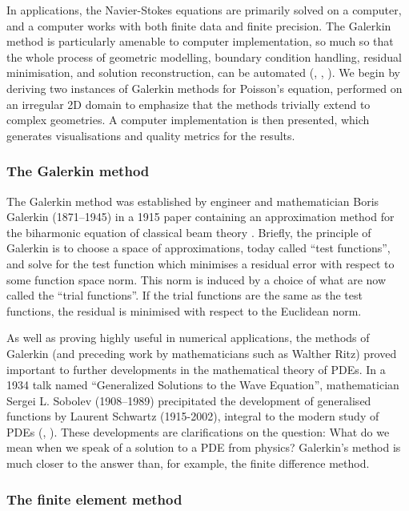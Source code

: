 In applications, the Navier-Stokes equations are primarily
solved on a computer, and a computer works with both finite data and finite precision. The Galerkin method
is particularly amenable to computer implementation, so much so that the whole process of geometric modelling, boundary condition handling,
residual minimisation, and solution reconstruction, can be automated (\cite{firedrake}, \cite{fenics_book}, \cite{DOLFIN}). We begin by
deriving two instances of Galerkin methods for Poisson's equation, performed on an irregular 2D domain to emphasize that the methods trivially extend
to complex geometries. A computer implementation is then presented, which generates visualisations and quality metrics for the results.



\subsubsection{The Galerkin method}
The Galerkin method was established by engineer and mathematician Boris Galerkin (1871--1945) in a 1915 paper containing
an approximation method for the biharmonic equation of classical beam theory \cite{boris_galerkin}. Briefly, the principle of Galerkin is to
choose a space of approximations, today called ``test functions'', and solve for the test function which minimises a residual error with respect
to some function space norm. This norm is induced by a choice of what are now called the ``trial functions''. If the trial functions are the same as the test functions,
the residual is minimised with respect to the Euclidean norm.

As well as proving highly useful
in numerical applications, the methods of Galerkin (and preceding work by mathematicians such as Walther Ritz) proved important to further developments
in the mathematical theory of PDEs. In a 1934 talk named ``Generalized Solutions to the Wave Equation'', mathematician Sergei L. Sobolev (1908--1989)
precipitated the development
of generalised functions by Laurent Schwartz (1915-2002), integral to the modern study of PDEs
(\cite{sobolev_web_page}, \cite{one_hundred_years_galerkin}).
These developments are clarifications on the question: What do we mean when we speak of a solution to a PDE from physics? Galerkin's method
is much closer to the answer than, for example, the finite difference method.


\subsubsection{The finite element method}


